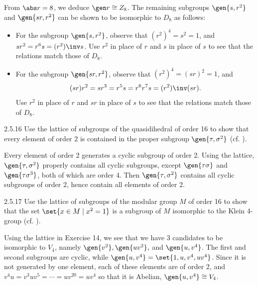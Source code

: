 \begin{sol}
    From $\abs r = 8$, we deduce $\gen r \cong Z_8$.
	The remaining subgroups $\gen{s, r^2}$ and $\gen{sr, r^2}$ can be shown to be isomorphic to $D_8$ as follows:
    \begin{itemize}
        \item For the subgroup $\gen{s, r^2}$, observe that $(r^2)^4 = s^2 = 1$, and $sr^2 = r^6s = (r^2)\inv s$.
	Use $r^2$ in place of $r$ and $s$ in place of $s$ to see that the relations match those of $D_8$.
        \item For the subgroup $\gen{sr, r^2}$, observe that $(r^2)^4 = (sr)^2 = 1$, and \[
 	(sr)r^2 = sr^3 = r^5s = r^6r^7s = (r^2)\inv(sr).
 \]
        Use $r^2$ in place of $r$ and $sr$ in place of $s$ to see that the relations match those of $D_8$. \qedhere
    \end{itemize}
\end{sol}

\begin{exercise}{2.5.16}
    Use the lattice of subgroups of the quasidihedral of order 16 to show that every element of order 2 is contained in the proper subgroup $\gen{\tau, \sigma^2}$ (cf. ).
\end{exercise}

\begin{sol}
    Every element of order 2 generates a cyclic subgroup of order 2.
	Using the lattice, $\gen{\tau, \sigma^2}$ properly contains all cyclic subgroups, except $\gen{\tau\sigma}$ and $\gen{\tau\sigma^3}$, both of which are order 4.
	Then $\gen{\tau, \sigma^2}$ contains all cyclic subgroups of order 2, hence contain all elements of order 2.
\end{sol}

\begin{exercise}{2.5.17}
    Use the lattice of subgroups of the modular group $M$ of order 16 to show that the set $\set{x \in M \mid x^2 = 1}$ is a subgroup of $M$ isomorphic to the Klein 4-group (cf. ).
\end{exercise}

\begin{sol}
    Using the lattice in Exercise 14, we see that we have 3 candidates to be isomorphic to $V_4$, namely $\gen{v^2}, \gen{uv^2},$ and $\gen{u, v^4}$.
	The first and second subgroups are cyclic, while $\gen{u, v^4} = \set{1, u, v^4, uv^4}$.
	Since it is not generated by one element, each of these elements are of order 2, and $v^4u = v^3uv^5 = \cdots = uv^{20} = uv^4$ so that it is Abelian, $\gen{u, v^4} \cong V_4$.
\end{sol}


